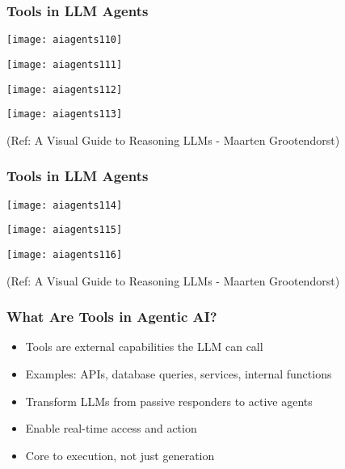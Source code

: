 \begin{frame}[fragile]\frametitle{Tools in LLM Agents}

        \begin{center}
        \texttt{[image: aiagents110]}

        \texttt{[image: aiagents111]}
		
        \texttt{[image: aiagents112]}

		\texttt{[image: aiagents113]}

        {\tiny (Ref: A Visual Guide to Reasoning LLMs - Maarten Grootendorst)}
        \end{center}


\end{frame}

\begin{frame}[fragile]\frametitle{Tools in LLM Agents}

        \begin{center}
		
        \texttt{[image: aiagents114]}

		\texttt{[image: aiagents115]}
		
		\texttt{[image: aiagents116]}
		

        {\tiny (Ref: A Visual Guide to Reasoning LLMs - Maarten Grootendorst)}
        \end{center}


\end{frame}

\begin{frame}[fragile]\frametitle{What Are Tools in Agentic AI?}
      \begin{itemize}
        \item Tools are external capabilities the LLM can call
        \item Examples: APIs, database queries, services, internal functions
        \item Transform LLMs from passive responders to active agents
        \item Enable real-time access and action
        \item Core to execution, not just generation
      \end{itemize}
\end{frame}

